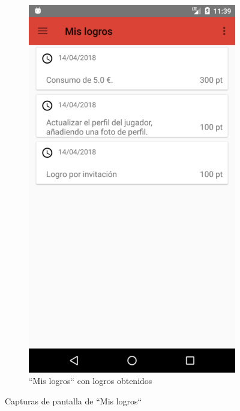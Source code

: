 \documentclass[twoside]{report}
\begin{document}
\begin{figure}[H]
\begin{center}
\begin{subfigure}[t]{.3\linewidth}
		\includegraphics[scale=0.2]{images/userguide/6.png}
		\caption{“Mis logros“ con logros obtenidos}
	\end{subfigure}
\caption{Capturas de pantalla de “Mis logros“}
\end{center}
\end{figure}
\end{document}
